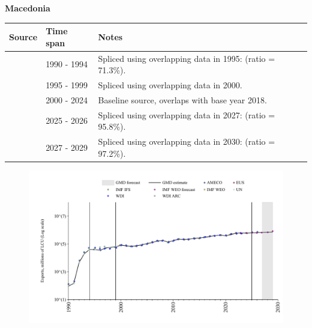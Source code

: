 \documentclass[12pt,a4paper,landscape]{article}
\begin{document}
\begin{adjustbox}{max totalsize={\paperwidth}{\paperheight},center}
\begin{minipage}[t][\textheight][t]{\textwidth}
\vspace*{0.5cm}
{}
\begin{center}
{\Large\bfseries Macedonia}
\end{center}
\vspace{0.5cm}
\begin{table}[H]
\centering
\small
\begin{tabular}{|l|l|l|}
\hline
\textbf{Source} & \textbf{Time span} & \textbf{Notes} \\
\hline
\rowcolor{white}\cite{WDI}& 1990 - 1994 &Spliced using overlapping data in 1995: (ratio = 71.3\%).\\
\rowcolor{lightgray}\cite{AMECO}& 1995 - 1999 &Spliced using overlapping data in 2000.\\
\rowcolor{white}\cite{EUS}& 2000 - 2024 &Baseline source, overlaps with base year 2018.\\
\rowcolor{lightgray}\cite{AMECO}& 2025 - 2026 &Spliced using overlapping data in 2027: (ratio = 95.8\%).\\
\rowcolor{white}\cite{IMF_WEO_forecast}& 2027 - 2029 &Spliced using overlapping data in 2030: (ratio = 97.2\%).\\
\hline
\end{tabular}
\end{table}
\begin{figure}[H]
\centering
\includegraphics[width=\textwidth,height=0.6\textheight,keepaspectratio]{graphs/MKD_exports.pdf}
\end{figure}
\end{minipage}
\end{adjustbox}
\end{document}
